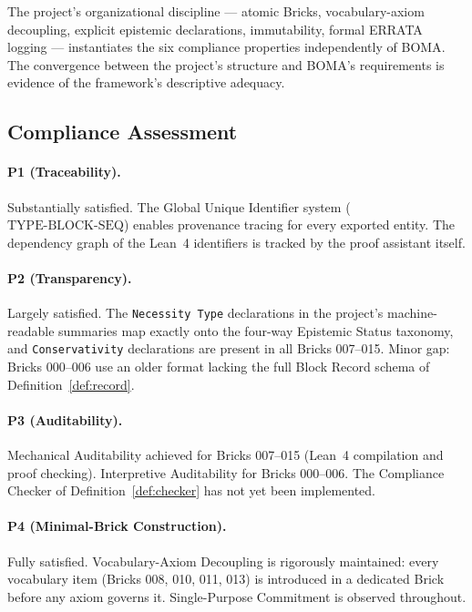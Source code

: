 \documentclass[12pt, a4paper]{article}
\theoremstyle{plain}
\theoremstyle{definition}
\theoremstyle{remark}
\newcommand{\BOMA}{\textsf{BOMA}}
\begin{document}
The project's organizational discipline --- atomic Bricks,
vocabulary-axiom decoupling, explicit epistemic declarations,
immutability, formal ERRATA logging --- instantiates the six
compliance properties independently of \BOMA{}. The convergence
between the project's structure and \BOMA{}'s requirements is
evidence of the framework's descriptive adequacy.

\subsection{Compliance Assessment}
\label{subsec:ex-compliance}

\paragraph{P1 (Traceability).}
Substantially satisfied. The Global Unique Identifier system
($\mathrm{TYPE\text{-}BLOCK\text{-}SEQ}$) enables provenance tracing
for every exported entity. The dependency graph of the Lean~4
identifiers is tracked by the proof assistant itself.

\paragraph{P2 (Transparency).}
Largely satisfied. The \texttt{Necessity Type} declarations in the
project's machine-readable summaries map exactly onto the four-way
Epistemic Status taxonomy, and \texttt{Conservativity} declarations
are present in all Bricks 007--015. Minor gap: Bricks 000--006 use an
older format lacking the full Block Record schema of
Definition~\ref{def:record}.

\paragraph{P3 (Auditability).}
Mechanical Auditability achieved for Bricks 007--015 (Lean~4
compilation and proof checking). Interpretive Auditability for Bricks
000--006. The Compliance Checker of Definition~\ref{def:checker} has
not yet been implemented.

\paragraph{P4 (Minimal-Brick Construction).}
Fully satisfied. Vocabulary-Axiom Decoupling is rigorously maintained:
every vocabulary item (Bricks 008, 010, 011, 013) is introduced in a
dedicated Brick before any axiom governs it. Single-Purpose Commitment
is observed throughout.
\end{document}
